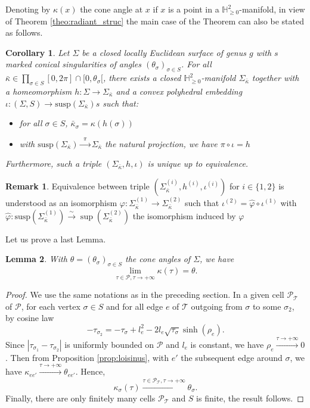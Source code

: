 \documentclass[a4paper,12pt]{article}
\def\H{\mathbb{H}}
\def\TT{\mathcal T}
\def\adm{\P}
\def\susp{\mathrm{susp}}
\def\adm{\mathcal{P}}
\def\susp{\mathrm{susp}}
\def\P{\mathcal{P}}
\def\CellPSigma{\P_\TT}
\newtheorem{lem}{Lemma}[section]		 %
\newtheorem{cor}[lem]{Corollary}
\theoremstyle{definition}
\newtheorem*{rem}{Remark}			 %
\begin{document}
			
			Denoting by $\kappa(x)$ the cone angle at $x$ if $x$ is a point in a $\H^2_{\geq0}$-manifold, in view of Theorem \ref{theo:radiant_struc} the main case of the Theorem can also be stated as follows.
			\begin{cor}\label{cor:closed_locally_euclidean_surface} 
			 	Let $\Sigma$ be a closed locally Euclidean surface of genus $g$ with $s$ marked conical singularities of angles $(\theta_\sigma)_{\sigma\in S}$.
				For all $\bar\kappa\in \prod_{\sigma \in S}[0,2\pi]\cap [0,\theta_\sigma[$, there exists a closed $\H^2_{\geq0}$-manifold $\Sigma_{\bar \kappa}$ together with a homeomorphism $h:\Sigma\rightarrow \Sigma_{\bar\kappa}$ and a convex polyhedral embedding $\iota: (\Sigma, S)\rightarrow \susp(\Sigma_{\bar\kappa})s$ such that:
				\begin{itemize}
				 \item for all $\sigma\in S$, $\bar\kappa_\sigma = \kappa(h(\sigma))$
				 \item with $\susp(\Sigma_{\bar\kappa})\xrightarrow{~~\pi~~} \Sigma_{\bar\kappa}$ the natural projection, we have $\pi\circ \iota = h$
				\end{itemize}
				Furthermore, such a triple $(\Sigma_{\bar\kappa},h,\iota)$ is unique up to equivalence.
			\end{cor}
			\begin{rem}\label{rem:equivalence_triple_understood_isomorphism} Equivalence between triple $(\Sigma_{\bar\kappa}^{(i)},h^{(i)},\iota^{(i)})$ for $i\in\{1,2\}$ is understood as an isomorphism $\varphi: \Sigma_{\bar\kappa}^{(1)} \rightarrow \Sigma_{\bar\kappa}^{(2)}$ such that $\iota^{(2)} = \hat\varphi \circ \iota^{(1)} $ with $\hat\varphi: \susp(\Sigma_{\bar\kappa}^{(1)}) \xrightarrow{\sim} \sup(\Sigma_{\bar\kappa}^{(2)})$ the isomorphism induced by $\varphi$
			 
			\end{rem}

			Let us prove a last Lemma.
			\begin{lem}\label{lem:limite_infty}With $\theta=(\theta_\sigma)_{\sigma\in S}$ the cone angles of $\Sigma$, we have
				 $$\lim_{\tau\in \adm,\tau\rightarrow+\infty} \kappa(\tau)=\theta.$$
				\end{lem}
				\begin{proof}We use the same notations as in the preceding section.
				 In a given cell $\CellPSigma$ of $\P$, for each vertex $\sigma \in S$ and for all edge $e$ of $\TT$ outgoing from $\sigma$ to some $\sigma_2$, by cosine law 
				 $$ -\tau_{\sigma_2} =-\tau_{\sigma}+l_e^2 - 2 l_e \sqrt{\tau_{\sigma}} \sinh(\rho_e).$$
				 Since $|\tau_{\sigma_1}-\tau_{\sigma_2}|$ is uniformly bounded on $\adm$ and $l_e$ is constant, we have $\rho_e \xrightarrow{\tau\rightarrow+\infty} 0$. Then from Proposition
				 \ref{prop:loisinus}, with $e'$ the subsequent edge around $\sigma$, we have $\kappa_{ee'} \xrightarrow{\tau\rightarrow +\infty} \theta_{ee'}$. Hence, $$\kappa_\sigma(\tau)\xrightarrow{\tau\in \CellPSigma,\tau\rightarrow +\infty} \theta_\sigma.$$
				 Finally, there are only finitely many cells $\CellPSigma$ and $S$ is finite, the result follows. 
				\end{proof}
\end{document}
